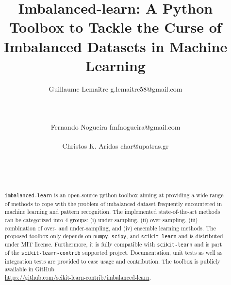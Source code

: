 \documentclass[twoside,11pt]{article}
\begin{document}
\title{Imbalanced-learn: A Python Toolbox to Tackle the Curse of Imbalanced Datasets in Machine Learning}
\author{Guillaume Lema\^itre \email g.lemaitre58@gmail.com \\ 
     \\ 
     \\ 
     \\ 
        \AND
        Fernando Nogueira \email fmfnogueira@gmail.com \\ 
         \\ 
        \AND
        Christos K. Aridas \email char@upatras.gr \\ 
         \\
         \\ 
         \\ 
        } 

\maketitle

\begin{abstract}%
\texttt{imbalanced-learn} is an open-source python toolbox aiming at providing a wide range of methods to cope with the problem of imbalanced dataset frequently encountered in machine learning and pattern recognition.
The implemented state-of-the-art methods can be categorized into 4 groups: (i) under-sampling, (ii) over-sampling, (iii) combination of over- and under-sampling, and (iv) ensemble learning methods.
The proposed toolbox only depends on \texttt{numpy}, \texttt{scipy}, and \texttt{scikit-learn} and is distributed under MIT license.
Furthermore, it is fully compatible with \texttt{scikit-learn} and is part of the \texttt{scikit-learn-contrib} supported project.
Documentation, unit tests as well as integration tests are provided to ease usage and contribution.
The toolbox is publicly available in GitHub \\ \url{https://github.com/scikit-learn-contrib/imbalanced-learn}.
\end{abstract}
\end{document}
